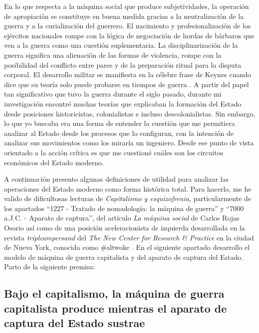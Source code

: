 En lo que respecta a la máquina social que produce subjetividades, la operación de apropiación se constituye en buena medida gracias a la neutralización de la guerra y a la curialización del guerrero. El nacimiento y profesionalización de los ejércitos nacionales rompe con la lógica de negociación de hordas de bárbaros que ven a la guerra como una cuestión suplementaria. La disciplinarización de la guerra significa una alienación de las formas de violencia, rompe con la posibilidad del conflicto entre pares y de la preparación ritual para la disputa corporal. El desarrollo militar se manifiesta en la célebre frase de Keynes cuando dice que su teoría solo puede probarse en tiempos de guerra \autocite{renshawWasThereKeynesian2016}. A partir del papel tan significativo que tuvo la guerra durante el siglo pasado, durante mi investigación encontré muchas teorías que explicaban la formación del Estado desde posiciones historicistas, colonialistas e incluso descolonialistas. Sin embargo, lo que yo buscaba era una forma de entender la cuestión que me permitiera analizar al Estado desde los procesos que lo configuran, con la intención de analizar sus movimientos como los miraría un ingeniero. Desde ese punto de vista orientado a la acción crítica es que me cuestioné cuáles son los circuitos económicos del Estado moderno.

A continuación presento algunas definiciones de utilidad para analizar las operaciones del Estado moderno como forma histórica total. Para hacerlo, me he valido de dificultosas lecturas de \emph{Capitalismo y esquizofrenia}, particularmente de los apartados \enquote{1227 - Tratado de nomadología: la máquina de guerra} y \enquote{7000 a.J.C. - Aparato de captura}, del artículo \emph{La máquina social} de Carlos Rojas Osorio \autocite{GILLESDELEUZEMAQUINA} así como de una posición aceleracionista de izquierda desarrollada en la revista \emph{tripleampersand} del \emph{The New Center for Research \& Practice} en la ciudad de Nueva York, conocida como \#altwoke \autocite{AltWokeCompanion2017}. En el siguiente apartado desarrollo el modelo de máquina de guerra capitalista y del aparato de captura del Estado. Parto de la siguiente premisa:

\subsection{Bajo el capitalismo, la máquina de guerra capitalista produce mientras el aparato de captura del Estado sustrae}
\label{sub:bajo-el-capitalismo-la-máquina-de-guerra-capitalista}

